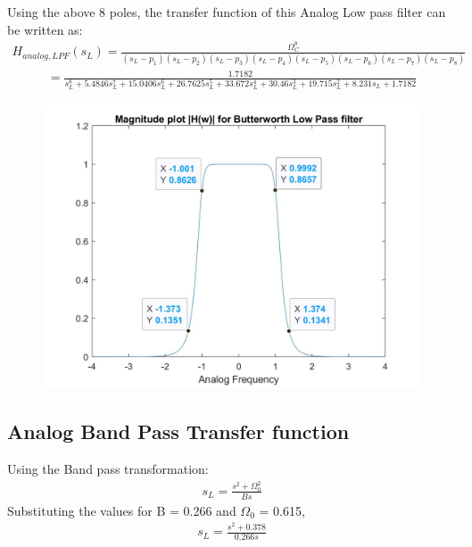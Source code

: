 \documentclass[12pt]{article}
\begin{document}
	\noindent Using the above 8 poles, the transfer function of this Analog Low pass filter can be written as:
	\begin{gather*}
		H_{analog, LPF}(s_L) = \frac{\Omega_C^8}{(s_L - p_1)(s_L - p_2)(s_L - p_3)(s_L - p_4)(s_L - p_5)(s_L - p_6)(s_L - p_7)(s_L - p_8)}
	\end{gather*}
	\begin{gather*}
		= \frac{1.7182}{s_L^8 + 5.4846s_L^7 + 15.0406s_L^6 + 26.7625s_L^5 + 33.672s_L^4 + 30.46s_L^3 + 19.715s_L^2 + 8.231s_L + 1.7182}
	\end{gather*}
	\begin{figure}[H]
		\centering 
		\includegraphics[width = 12cm]{Filter1ALPF.jpg}
	\end{figure}
	
	
	\color{cyan}
	\subsection{Analog Band Pass Transfer function}
	\color{black}
	
	Using the Band pass transformation:
	\begin{gather*}
		s_L = \frac{s^2 + \Omega_0^2}{Bs}
	\end{gather*}
	Substituting the values for B = 0.266 and $\Omega_0$ = 0.615,
		\begin{gather*}
		s_L = \frac{s^2 + 0.378}{0.266s}
	\end{gather*}
	
\end{document}
